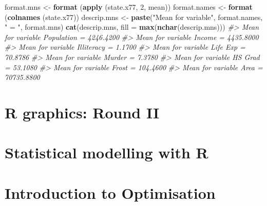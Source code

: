 \documentclass[
]{book}
\newenvironment{Shaded}{\begin{snugshade}}{\end{snugshade}}
\newcommand{\AttributeTok}[1]{\textcolor[rgb]{0.13,0.29,0.53}{#1}}
\newcommand{\CommentTok}[1]{\textcolor[rgb]{0.56,0.35,0.01}{\textit{#1}}}
\newcommand{\DecValTok}[1]{\textcolor[rgb]{0.00,0.00,0.81}{#1}}
\newcommand{\FunctionTok}[1]{\textcolor[rgb]{0.13,0.29,0.53}{\textbf{#1}}}
\newcommand{\NormalTok}[1]{#1}
\newcommand{\OtherTok}[1]{\textcolor[rgb]{0.56,0.35,0.01}{#1}}
\newcommand{\StringTok}[1]{\textcolor[rgb]{0.31,0.60,0.02}{#1}}
\begin{document}
\begin{Shaded}
\begin{Highlighting}[]
\NormalTok{format.mns }\OtherTok{\textless{}{-}} \FunctionTok{format}\NormalTok{ (}\FunctionTok{apply}\NormalTok{ (state.x77, }\DecValTok{2}\NormalTok{, mean))}
\NormalTok{format.names }\OtherTok{\textless{}{-}} \FunctionTok{format}\NormalTok{ (}\FunctionTok{colnames}\NormalTok{ (state.x77))}
\NormalTok{descrip.mns }\OtherTok{\textless{}{-}} \FunctionTok{paste}\NormalTok{(}\StringTok{"Mean for variable"}\NormalTok{, format.names, }\StringTok{" = "}\NormalTok{, format.mns)}
\FunctionTok{cat}\NormalTok{(descrip.mns, }\AttributeTok{fill =} \FunctionTok{max}\NormalTok{(}\FunctionTok{nchar}\NormalTok{(descrip.mns)))}
\CommentTok{\#\textgreater{} Mean for variable Population  =   4246.4200 }
\CommentTok{\#\textgreater{} Mean for variable Income      =   4435.8000 }
\CommentTok{\#\textgreater{} Mean for variable Illiteracy  =      1.1700 }
\CommentTok{\#\textgreater{} Mean for variable Life Exp    =     70.8786 }
\CommentTok{\#\textgreater{} Mean for variable Murder      =      7.3780 }
\CommentTok{\#\textgreater{} Mean for variable HS Grad     =     53.1080 }
\CommentTok{\#\textgreater{} Mean for variable Frost       =    104.4600 }
\CommentTok{\#\textgreater{} Mean for variable Area        =  70735.8800}
\end{Highlighting}
\end{Shaded}

\chapter{R graphics: Round II}\label{graphics2}

\chapter{Statistical modelling with R}\label{modelling}

\chapter{Introduction to Optimisation}\label{optimisation}


\end{document}
